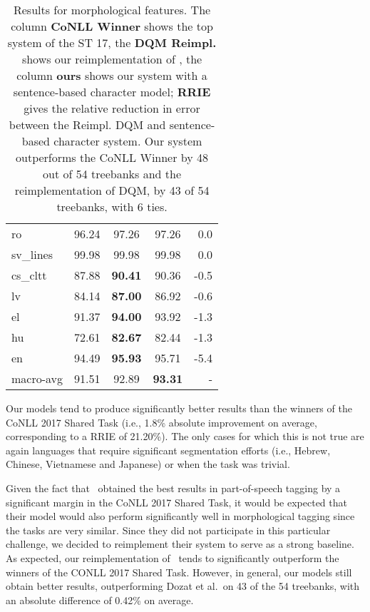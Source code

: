 \documentclass[11pt,a4paper]{article}
\begin{document}
\begin{table}[]
\begin{center}
\begin{tabular}{|l|c||c|c|r|}
ro           &     96.24  &     97.26    &  97.26 &   0.0\\
sv\_lines    &  99.98  &  99.98    &  99.98 &     0.0\\
cs\_cltt     &     87.88  & \bf  90.41    &  90.36 &    -0.5\\
lv           &     84.14  & \bf  87.00    &  86.92 &     -0.6\\
el           &     91.37  & \bf  94.00    &  93.92 &    -1.3\\
hu           &     72.61  & \bf 82.67    &     82.44 &  -1.3\\
en           &     94.49  & \bf 95.93    &     95.71 &  -5.4\\
\hline
macro-avg    & 91.51      &     92.89    &\bf  93.31 & - \\\hline
\end{tabular}
\end{center}
\caption{\label{table:morphology-results} Results for morphological features. The column \textbf{CoNLL Winner} shows the top system of the ST 17, the \textbf{DQM Reimpl.} shows our reimplementation of , the column \textbf{ours} shows our system with a sentence-based character model; \textbf{RRIE} gives the relative reduction in error between the Reimpl. DQM and sentence-based character system. Our system outperforms the CoNLL Winner by 48 out of 54 treebanks and the reimplementation of DQM, by 43 of 54 treebanks, with 6 ties. 
}
\end{table}

Our models tend to produce significantly better results than the winners of the CoNLL 2017 Shared Task (i.e., 1.8\% absolute improvement on average, corresponding to a RRIE of 21.20\%). The only cases for which this is not true are again languages that require significant segmentation efforts (i.e., Hebrew, Chinese, Vietnamese and Japanese) or when the task was trivial.

Given the fact that~ obtained the best results in part-of-speech tagging by a significant margin in the CoNLL 2017 Shared Task, it would be expected that their model would also perform significantly well in morphological tagging since the tasks are very similar. Since they did not participate in this particular challenge, we decided to reimplement their system to serve as a strong baseline. 
As expected, our reimplementation of~ tends to significantly outperform the winners of the CONLL 2017 Shared Task. However, in general, our models still obtain better results, outperforming Dozat et al.\ on 43 of the 54 treebanks, with an absolute difference of 0.42\% on average.
\end{document}
